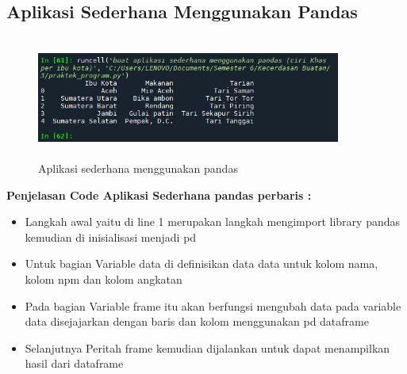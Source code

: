 \subsection{Aplikasi Sederhana Menggunakan Pandas}
\begin{figure}[!htbp]
    \centering

    \includegraphics[width=10cm,height=4cm]{figures/Cp3-1.png}
    \caption{Aplikasi sederhana menggunakan pandas}
    \label{penanda}
\end{figure}
\textbf{Penjelasan Code Aplikasi Sederhana pandas perbaris :}
\begin{itemize}
    \item Langkah awal yaitu di line 1 merupakan langkah mengimport library pandas kemudian di inisialisasi menjadi pd
    \item Untuk bagian Variable data di definisikan data data untuk kolom nama, kolom npm dan kolom angkatan
    \item Pada bagian Variable frame itu akan berfungsi mengubah data pada variable data disejajarkan dengan baris dan kolom menggunakan pd dataframe
    \item Selanjutnya Peritah frame kemudian dijalankan untuk dapat menampilkan hasil dari dataframe
\end{itemize}

